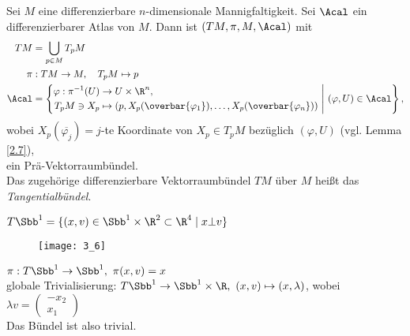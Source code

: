 \begin{exmp}
	Sei $M$ eine differenzierbare $n$-dimensionale Mannigfaltigkeit. Sei $\Acal$ ein differenzierbarer Atlas von $M$. Dann ist $(TM, \pi, M, \Acal)$ mit
	\begin{align*}
		TM &= \bigcup_{p \in M} T_pM\\
		\pi&: TM \to M,\quad T_pM \mapsto p\\
		\Acal&= \left\{ \begin{aligned}
			\varphi: \pi^{-1}(U) &\to U\times \R^n,\\
			 T_pM \ni X_p &\mapsto \left( p, X_p(\overbar{\varphi_1}), \dotsc, X_p(\overbar{\varphi_n}) \right)
		\end{aligned} \ \middle|\ (\varphi,U) \in \Acal \right\},
	\end{align*}
	wobei $ X_p (\overbar{\varphi_j}) = j $-te Koordinate von $X_p \in T_pM$ bezüglich $(\varphi,U)$ (vgl. Lemma \ref{2.7}),\\
	ein Prä-Vektorraumbündel.\\
	Das zugehörige differenzierbare Vektorraumbündel $TM$ über $M$ heißt das \emph{Tangentialbündel}. 
\end{exmp}

\begin{exmp*}
	$ T\Sbb^1 = \{(x,v) \in \Sbb^1 \times \R^2 \subset \R^4 \mid x \bot v\} $\\
	\begin{minipage}{\linewidth}
		\begin{wrapfigure}{R}{4cm}
			\centering
			\texttt{[image: 3\_6]}
		\end{wrapfigure}
		$ \pi: T\Sbb^1 \to \Sbb^1,\ \pi(x,v) = x $\\
		globale Trivialisierung: $ T\Sbb^1 \to \Sbb^1 \times \R,\ (x,v) \mapsto (x,\lambda) $, wobei $\lambda v = \begin{pmatrix}
			-x_2\\x_1
		\end{pmatrix}$\\
		Das Bündel ist also trivial.
	\end{minipage}
\end{exmp*}

